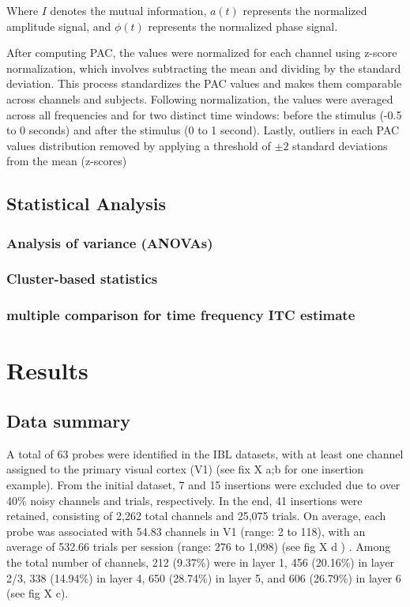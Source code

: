\documentclass[
  letterpaper,
  DIV=11,
  numbers=noendperiod]{scrartcl}
\begin{document}
Where \(I\) denotes the mutual information, \(a(t)\) represents the
normalized amplitude signal, and \(\phi(t)\) represents the normalized
phase signal.

After computing PAC, the values were normalized for each channel using
z-score normalization, which involves subtracting the mean and dividing
by the standard deviation. This process standardizes the PAC values and
makes them comparable across channels and subjects. Following
normalization, the values were averaged across all frequencies and for
two distinct time windows: before the stimulus (-0.5 to 0 seconds) and
after the stimulus (0 to 1 second). Lastly, outliers in each PAC values
distribution removed by applying a threshold of \(\pm 2\) standard
deviations from the mean (z-scores)

\subsection{Statistical Analysis}\label{statistical-analysis}

\subsubsection{Analysis of variance
(ANOVAs)}\label{analysis-of-variance-anovas}

\subsubsection{Cluster-based statistics}\label{cluster-based-statistics}

\subsubsection{multiple comparison for time frequency ITC
estimate}\label{multiple-comparison-for-time-frequency-itc-estimate}

\section{Results}\label{results}

\subsection{Data summary}\label{data-summary}

A total of 63 probes were identified in the IBL datasets, with at least
one channel assigned to the primary visual cortex (V1) (see fix X a;b
for one insertion example). From the initial dataset, 7 and 15
insertions were excluded due to over 40\% noisy channels and trials,
respectively. In the end, 41 insertions were retained, consisting of
2,262 total channels and 25,075 trials. On average, each probe was
associated with 54.83 channels in V1 (range: 2 to 118), with an average
of 532.66 trials per session (range: 276 to 1,098) (see fig X d ) .
Among the total number of channels, 212 (9.37\%) were in layer 1, 456
(20.16\%) in layer 2/3, 338 (14.94\%) in layer 4, 650 (28.74\%) in layer
5, and 606 (26.79\%) in layer 6 (see fig X c).
\end{document}
